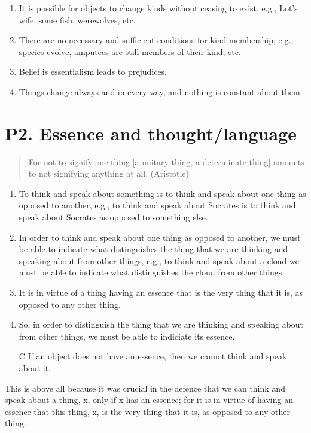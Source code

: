 \documentclass[article,oneside]{memoir}
\begin{document}
\begin{enumerate}
\item It is possible for objects to change kinds without ceasing to exist, e.g., Lot's wife, some fish, werewolves, etc.
\item There are no necessary and sufficient conditions for kind membership, e.g., species evolve, amputees are still members of their kind, etc.
\item Belief is essentialism leads to prejudices. 
\item Things change always and in every way, and nothing is constant about them.
\end{enumerate}

\section{P2. Essence and thought/language}
\begin{quotation}
For not to signify one thing [a unitary thing, a determinate thing] amounts to not signifying anything at all. (Aristotle)
\end{quotation}


\begin{enumerate}
\item To think and speak about something is to think and speak about one thing as opposed to another, e.g., to think and speak about Socrates is to think and speak about Socrates as opposed to something else. 
\item  In order to think and speak about one thing as opposed to another, we must be able to indicate what distinguishes the thing that we are thinking and speaking about from other things, e.g., to think and speak about a cloud we must be able to indicate what distinguishes the cloud from other things.  
\item It is in virtue of a thing having an essence that is the very thing that it is, as opposed to any other thing.
\item So, in order to distinguish the thing that we are thinking and speaking about from other things, we must be able to indiciate its essence. 
\item[C] If an object does not have an essence, then we cannot think and speak about it. 
\end{enumerate}

This is above all because it was crucial in the defence that we can think and speak about a thing, x, only if x has an essence; for it is in virtue of having an essence that this thing, x, is the very thing that it is, as opposed to any other thing.
\end{document}
